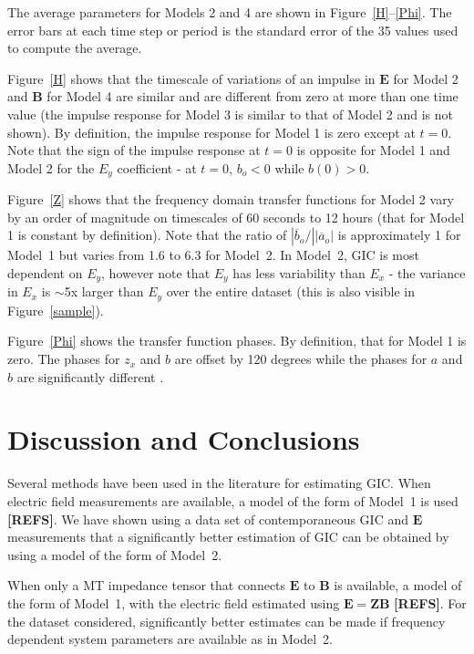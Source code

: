 \documentclass[draft,linenumbers]{agujournal2018}
\begin{document}
The average parameters for Models 2 and 4 are shown in Figure~\ref{H}--\ref{Phi}. The error bars at each time step or period is the standard error of the 35 values used to compute the average. 

Figure~\ref{H} shows that the timescale of variations of an impulse in $\mathbf{E}$ for Model 2 and $\mathbf{B}$ for Model 4 are similar and are different from zero at more than one time value (the impulse response for Model 3 is similar to that of Model 2 and is not shown). By definition, the impulse response for Model 1 is zero except at $t=0$. Note that the sign of the impulse response at $t=0$ is opposite for Model 1 and Model 2 for the $E_y$ coefficient - at $t=0$, $b_o < 0$ while $b(0)>0$.

Figure~\ref{Z} shows that the frequency domain transfer functions for Model 2 vary by an order of magnitude on timescales of 60 seconds to 12 hours (that for Model 1 is constant by definition). Note that the ratio of $|\overline{b}_o/||\overline{a}_o|$ is approximately 1 for Model~1 but varies from 1.6 to 6.3 for Model~2. In Model~2, GIC is most dependent on $E_y$, however note that $E_y$ has less variability than $E_x$ - the variance in $E_x$ is $\sim$5x larger than $E_y$ over the entire dataset (this is also visible in Figure~\ref{sample}). 

Figure~\ref{Phi} shows the transfer function phases. By definition, that for Model 1 is zero. The phases for $z_x$ and $b$ are offset by 120 degrees  while the phases for $a$ and $b$ are significantly different .

\section{Discussion and Conclusions}

Several methods have been used in the literature for estimating GIC. When electric field measurements are available, a model of the form of Model~1 is used  {\color{red} \textbf{[REFS]}}. We have shown using a data set of contemporaneous GIC and $\mathbf{E}$ measurements that a significantly better estimation of GIC can be obtained by using a model of the form of Model~2.

When only a MT impedance tensor that connects $\mathbf{E}$ to $\mathbf{B}$ is available, a model of the form of Model~1, with the electric field estimated using $\mathbf{E}=\mathbf{Z}\mathbf{B}$  {\color{red} \textbf{[REFS]}}. For the dataset considered, significantly better estimates can be made if frequency dependent system parameters are available as in Model~2.
\end{document}
